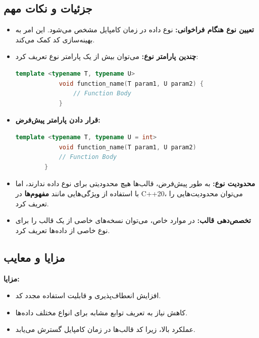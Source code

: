 \documentclass[12pt, a4paper]{report}
\begin{document}
\subsection{جزئیات و نکات مهم}
\begin{itemize}
	\item \textbf{تعیین نوع هنگام فراخوانی:} نوع داده در زمان کامپایل مشخص می‌شود. این امر به بهینه‌سازی کد کمک می‌کند.
	\item \textbf{چندین پارامتر نوع:} می‌توان بیش از یک پارامتر نوع تعریف کرد:
	\begin{LTR}
		\begin{lstlisting}[language=C++, breaklines=true]
			template <typename T, typename U>
			void function_name(T param1, U param2) {
				// Function Body
			}
		\end{lstlisting}
	\end{LTR}
	
	\item \textbf{قرار دادن پارامتر پیش‌فرض:}
	\begin{LTR}
		\begin{lstlisting}[language=C++, breaklines=true]
			template <typename T, typename U = int>
			void function_name(T param1, U param2) 
			// Function Body
		}
	\end{lstlisting}
\end{LTR}

\item \textbf{محدودیت نوع:} به طور پیش‌فرض، قالب‌ها هیچ محدودیتی برای نوع داده ندارند، اما با استفاده از ویژگی‌هایی مانند \textbf{مفهوم‌ها} در C++20، می‌توان محدودیت‌هایی را تعریف کرد.
\item \textbf{تخصص‌دهی قالب:} در موارد خاص، می‌توان نسخه‌های خاصی از یک قالب را برای نوع خاصی از داده‌ها تعریف کرد.
\end{itemize}

\subsection{مزایا و معایب}
\textbf{مزایا:}
\begin{itemize}
\item افزایش انعطاف‌پذیری و قابلیت استفاده مجدد کد.
\item کاهش نیاز به تعریف توابع مشابه برای انواع مختلف داده‌ها.
\item عملکرد بالا، زیرا کد قالب‌ها در زمان کامپایل گسترش می‌یابد.
\end{itemize}
\end{document}
